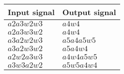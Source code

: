 \begin{center}
	\begin{tabular}{ || m{3cm}| m{3cm} || } 
	\hline
	Input signal & Output signal\\ 
	\hline \hline
	$a2a3w2w3$ & $a4w4$ \\
	$a2a3w3w2$ & $a4w4$ \\
	$a3a2w2w3$ & $a5a4a5w5$ \\
	$a3a2w3w2$ & $a5a4w4$ \\
	$a2w2a3w3$ & $a4w4a5w5$ \\
	$a3w3a2w2$ & $a5w5a4w4$ \\
	\hline
	\end{tabular}
\end{center}

